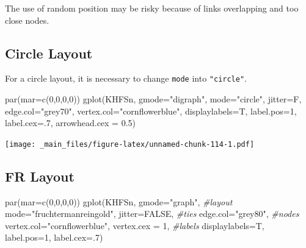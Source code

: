 \documentclass[
  notitlepage,
  onecolumn,
  openany]{book}
\newenvironment{Shaded}{\begin{snugshade}}{\end{snugshade}}
\newcommand{\AttributeTok}[1]{\textcolor[rgb]{0.77,0.63,0.00}{#1}}
\newcommand{\CommentTok}[1]{\textcolor[rgb]{0.56,0.35,0.01}{\textit{#1}}}
\newcommand{\ConstantTok}[1]{\textcolor[rgb]{0.00,0.00,0.00}{#1}}
\newcommand{\DecValTok}[1]{\textcolor[rgb]{0.00,0.00,0.81}{#1}}
\newcommand{\FloatTok}[1]{\textcolor[rgb]{0.00,0.00,0.81}{#1}}
\newcommand{\FunctionTok}[1]{\textcolor[rgb]{0.00,0.00,0.00}{#1}}
\newcommand{\NormalTok}[1]{#1}
\newcommand{\StringTok}[1]{\textcolor[rgb]{0.31,0.60,0.02}{#1}}
\begin{document}
The use of random position may be risky because of links overlapping and too close nodes.

\hypertarget{circle-layout}{%
\subsection{Circle Layout}\label{circle-layout}}

For a circle layout, it is necessary to change \texttt{mode} into \texttt{"circle"}.

\begin{Shaded}
\begin{Highlighting}[]
\FunctionTok{par}\NormalTok{(}\AttributeTok{mar=}\FunctionTok{c}\NormalTok{(}\DecValTok{0}\NormalTok{,}\DecValTok{0}\NormalTok{,}\DecValTok{0}\NormalTok{,}\DecValTok{0}\NormalTok{))}
\FunctionTok{gplot}\NormalTok{(KHFSn, }
      \AttributeTok{gmode=}\StringTok{"digraph"}\NormalTok{,}
      \AttributeTok{mode=}\StringTok{"circle"}\NormalTok{,}
      \AttributeTok{jitter=}\NormalTok{F,}
      \AttributeTok{edge.col=}\StringTok{"grey70"}\NormalTok{,}
      \AttributeTok{vertex.col=}\StringTok{"cornflowerblue"}\NormalTok{,}
      \AttributeTok{displaylabels=}\NormalTok{T,}
      \AttributeTok{label.pos=}\DecValTok{1}\NormalTok{,}
      \AttributeTok{label.cex=}\NormalTok{.}\DecValTok{7}\NormalTok{,}
      \AttributeTok{arrowhead.cex =} \FloatTok{0.5}\NormalTok{)}
\end{Highlighting}
\end{Shaded}

\texttt{[image: \_main\_files/figure-latex/unnamed-chunk-114-1.pdf]}

\hypertarget{fr-layout}{%
\subsection{FR Layout}\label{fr-layout}}

\begin{Shaded}
\begin{Highlighting}[]
\FunctionTok{par}\NormalTok{(}\AttributeTok{mar=}\FunctionTok{c}\NormalTok{(}\DecValTok{0}\NormalTok{,}\DecValTok{0}\NormalTok{,}\DecValTok{0}\NormalTok{,}\DecValTok{0}\NormalTok{))}
\FunctionTok{gplot}\NormalTok{(KHFSn, }
      \AttributeTok{gmode=}\StringTok{"graph"}\NormalTok{,}
      \CommentTok{\#layout}
      \AttributeTok{mode=}\StringTok{"fruchtermanreingold"}\NormalTok{,}
      \AttributeTok{jitter=}\ConstantTok{FALSE}\NormalTok{,}
      \CommentTok{\#ties}
      \AttributeTok{edge.col=}\StringTok{"grey80"}\NormalTok{,}
      \CommentTok{\#nodes}
      \AttributeTok{vertex.col=}\StringTok{"cornflowerblue"}\NormalTok{,}
      \AttributeTok{vertex.cex =} \DecValTok{1}\NormalTok{,}
      \CommentTok{\#labels}
      \AttributeTok{displaylabels=}\NormalTok{T,}
      \AttributeTok{label.pos=}\DecValTok{1}\NormalTok{,}
      \AttributeTok{label.cex=}\NormalTok{.}\DecValTok{7}\NormalTok{)}
\end{Highlighting}
\end{Shaded}
\end{document}
